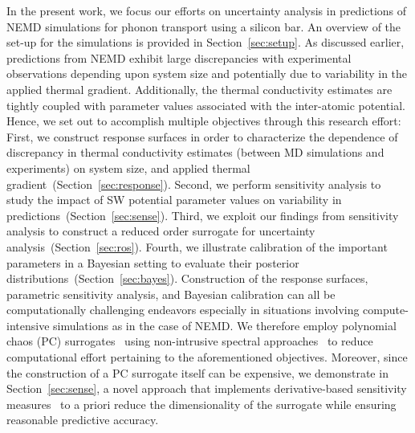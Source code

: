 In the present work, we focus our efforts on uncertainty analysis in predictions of NEMD simulations
for phonon transport using a silicon bar. An overview of the set-up for the simulations is
provided in Section~\ref{sec:setup}. As discussed earlier, predictions from NEMD
exhibit large discrepancies with experimental observations depending upon system size and potentially
due to variability in the applied thermal gradient. Additionally, the thermal conductivity estimates are
tightly coupled with parameter values associated with the inter-atomic potential. Hence, we set out to
accomplish multiple objectives through this research effort: First, we construct response surfaces
in order to characterize the dependence of discrepancy in thermal conductivity estimates (between
MD simulations and experiments) on system size, and applied thermal gradient~(Section~\ref{sec:response}).
Second, we perform sensitivity analysis to study the impact of SW potential parameter values on 
variability in predictions~(Section~\ref{sec:sense}).
Third, we exploit our findings from sensitivity analysis to 
construct a reduced order surrogate for uncertainty analysis~(Section~\ref{sec:ros}). 
Fourth, we illustrate calibration
of the important parameters in a Bayesian setting to evaluate their posterior
distributions~(Section~\ref{sec:bayes}). Construction of the
response surfaces, parametric sensitivity analysis, and Bayesian calibration can all be computationally
challenging endeavors especially in situations involving compute-intensive simulations as in the
case of NEMD. We therefore employ polynomial chaos (PC) surrogates~\cite{Xiu:2002,Ghanem:1990}
using non-intrusive spectral approaches~\cite{Olivier:2010} to reduce computational effort pertaining
to the aforementioned objectives. Moreover, since the construction of a PC surrogate itself can be
expensive, we demonstrate in Section~\ref{sec:sense}, a novel approach that implements derivative-based
sensitivity measures~\cite{Sobol:2010} to a priori reduce the dimensionality of the surrogate while
ensuring reasonable predictive accuracy. 
